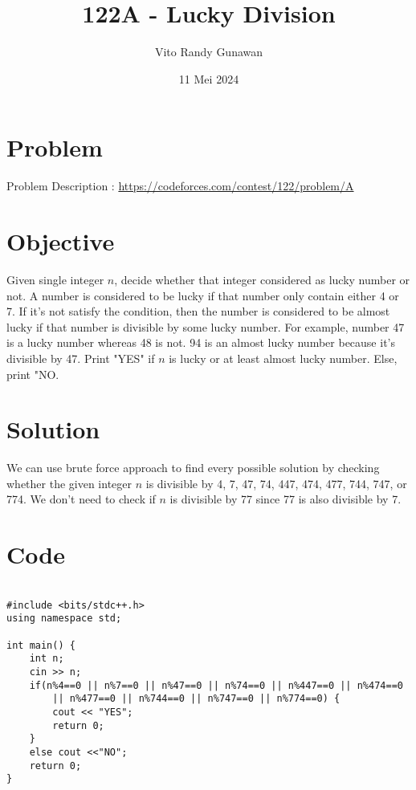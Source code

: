 \documentclass{article}
\title{122A - Lucky Division}
\author{Vito Randy Gunawan}
\date{11 Mei 2024}
\begin{document}
\maketitle


\section{Problem}

Problem Description : \href{https://codeforces.com/contest/122/problem/A}{https://codeforces.com/contest/122/problem/A}

\section{Objective}

Given single integer $n$, decide whether that integer considered as lucky number or not. A number is considered to be lucky if that number only contain either 4 or 7. If it's not satisfy the condition, then the number is considered to be almost lucky if that number is divisible by some lucky number. For example, number 47 is a lucky number whereas 48 is not. 94 is an almost lucky number because it's divisible by 47. Print "YES" if $n$ is lucky or at least almost lucky number. Else, print "NO.

\section{Solution}

We can use brute force approach to find every possible solution by checking whether the given integer $n$ is divisible by 4, 7, 47, 74, 447, 474, 477, 744, 747, or 774. We don't need to check if $n$ is divisible by 77 since 77 is also divisible by 7.

\newpage
\section{Code}


\begin{lstlisting}

#include <bits/stdc++.h>
using namespace std;
 
int main() {
    int n;
    cin >> n;
    if(n%4==0 || n%7==0 || n%47==0 || n%74==0 || n%447==0 || n%474==0 
        || n%477==0 || n%744==0 || n%747==0 || n%774==0) {
        cout << "YES"; 
        return 0;
    }
    else cout <<"NO";
    return 0;
}
 
\end{lstlisting}
\end{document}
